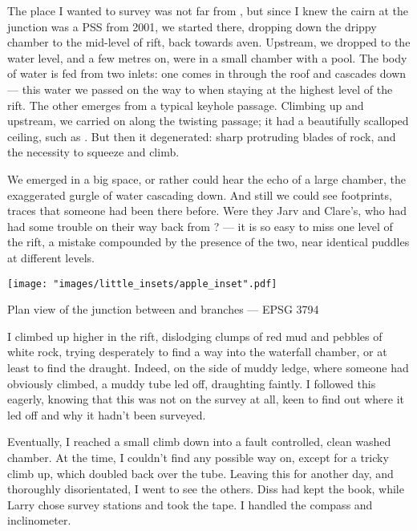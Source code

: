 	The place I wanted to survey was not far from , but since I knew the cairn at the junction was a PSS from 2001, we started there, dropping down the drippy chamber to the mid-level of rift, back towards  aven. Upstream, we dropped to the water level, and a few metres on, were in a small chamber with a pool. The body of water is fed from two inlets: one comes in through the roof and cascades down --- this water we passed on the way to  when staying at the highest level of the rift. The other emerges from a typical keyhole passage. Climbing up and upstream, we carried on along the twisting passage; it had a beautifully scalloped ceiling, such as . But then it degenerated: sharp protruding blades of rock, and the necessity to squeeze and climb. 
	
	We emerged in a big space, or rather could hear the echo of a large chamber, the exaggerated gurgle of water cascading down. And still we could see footprints, traces that someone had been there before. Were they Jarv and Clare's, who had had some trouble on their way back from ? --- it is so easy to miss one level of the rift, a mistake compounded by the presence of the two, near identical puddles at different levels. 
	
\begin{marginfigure}
	\texttt{[image: "images/little\_insets/apple\_inset".pdf]}
	\caption*{Plan view of the \protect{} junction between \protect{} and \protect{} branches --- EPSG 3794}
\end{marginfigure}
	
	I climbed up higher in the rift, dislodging clumps of red mud and pebbles of white rock, trying desperately to find a way into the waterfall chamber, or at least to find the draught. Indeed, on the side of muddy ledge, where someone had obviously climbed, a muddy tube led off, draughting faintly. I followed this eagerly, knowing that this was not on the survey at all, keen to find out where it led off and why it hadn't been surveyed. 

	Eventually, I reached a small climb down into a fault controlled, clean washed chamber. At the time, I couldn't find any possible way on, except for a tricky climb up, which doubled back over the tube. Leaving this for another day, and thoroughly disorientated, I went to see the others. Diss had kept the book, while Larry chose survey stations and took the tape. I handled the compass and inclinometer. 
	
